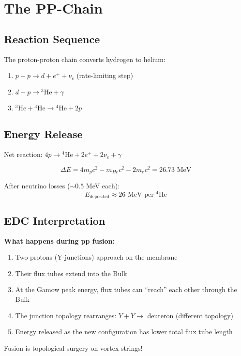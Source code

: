 \documentclass[12pt,a4paper]{article}
\begin{document}

\section{The PP-Chain}

\subsection{Reaction Sequence}

The proton-proton chain converts hydrogen to helium:

\begin{enumerate}
    \item $p + p \to d + e^+ + \nu_e$ \quad (rate-limiting step)
    \item $d + p \to {}^3\text{He} + \gamma$
    \item ${}^3\text{He} + {}^3\text{He} \to {}^4\text{He} + 2p$
\end{enumerate}

\subsection{Energy Release}

Net reaction: $4p \to {}^4\text{He} + 2e^+ + 2\nu_e + \gamma$

\begin{equation}
\Delta E = 4m_p c^2 - m_{He} c^2 - 2m_e c^2 = 26.73 \text{ MeV}
\end{equation}

After neutrino losses ($\sim 0.5$ MeV each):
\begin{equation}
E_{\text{deposited}} \approx 26 \text{ MeV per }{}^4\text{He}
\end{equation}

\subsection{EDC Interpretation}

\begin{insight}
\textbf{What happens during pp fusion:}

\begin{enumerate}
    \item Two protons (Y-junctions) approach on the membrane
    \item Their flux tubes extend into the Bulk
    \item At the Gamow peak energy, flux tubes can ``reach'' each other through the Bulk
    \item The junction topology rearranges: $Y + Y \to $ deuteron (different topology)
    \item Energy released as the new configuration has lower total flux tube length
\end{enumerate}

Fusion is topological surgery on vortex strings!
\end{insight}
\end{document}
